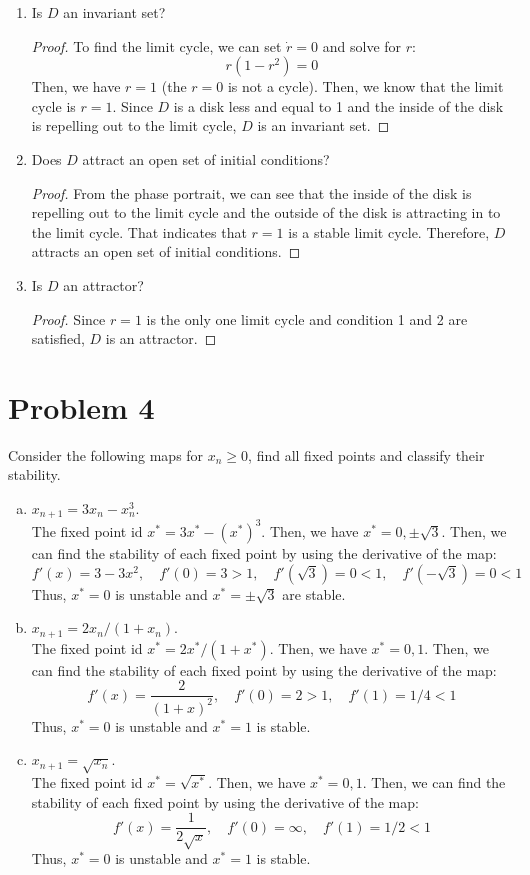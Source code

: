 \documentclass[12pt]{exam}
\begin{document}
\begin{enumerate}
	\item Is $D$ an invariant set?
	\begin{proof}
	To find the limit cycle, we can set $\dot{r} = 0$ and solve for $r$:
	\[ r(1-r^2) = 0 \]
	Then, we have $r = 1$ (the $r=0$ is not a cycle). Then, we know that the limit cycle is $r=1$. Since $D$ is a disk less and equal to 1 and the inside of the disk is repelling out to the limit cycle, $D$ is an invariant set.
	\end{proof}

	\item Does $D$ attract an open set of initial conditions?
	\begin{proof}
	From the phase portrait, we can see that the inside of the disk is repelling out to the limit cycle and the outside of the disk is attracting in to the limit cycle. That indicates that $r=1$ is a stable limit cycle. Therefore, $D$ attracts an open set of initial conditions.
	\end{proof}

	\item Is $D$ an attractor?
	\begin{proof}
	Since $r=1$ is the only one limit cycle and condition 1 and 2 are satisfied, $D$ is an attractor.
	\end{proof}
\end{enumerate}

\section*{Problem 4}
Consider the following maps for $x_n \geq 0$, find all fixed points and classify their stability.

\begin{enumerate}[(a)]
	\item $x_{n+1} = 3x_n - x_n^3$.\\
	The fixed point id $x^* = 3x^* - (x^*)^3$. Then, we have $x^* = 0, \pm \sqrt{3}$. Then, we can find the stability of each fixed point by using the derivative of the map:
	\[ f'(x) = 3 - 3x^2, \quad f'(0) = 3 >1, \quad f'(\sqrt{3}) = 0 < 1, \quad f'(-\sqrt{3}) = 0 < 1 \]
	Thus, $x^* = 0$ is unstable and $x^* = \pm \sqrt{3}$ are stable.

	\item $x_{n+1} = 2x_n/(1+x_n)$.\\
	The fixed point id $x^* = 2x^*/(1+x^*)$. Then, we have $x^* = 0, 1$. Then, we can find the stability of each fixed point by using the derivative of the map:
	\[ f'(x) = \frac{2}{(1+x)^2}, \quad f'(0) = 2 >1, \quad f'(1) = 1/4 < 1 \]
	Thus, $x^* = 0$ is unstable and $x^* = 1$ is stable.

	\item $x_{n+1} = \sqrt{x_n}$.\\
	The fixed point id $x^* = \sqrt{x^*}$. Then, we have $x^* = 0, 1$. Then, we can find the stability of each fixed point by using the derivative of the map:
	\[ f'(x) = \frac{1}{2\sqrt{x}}, \quad f'(0) = \infty, \quad f'(1) = 1/2 < 1 \]
	Thus, $x^* = 0$ is unstable and $x^* = 1$ is stable.

\end{enumerate}
\end{document}

